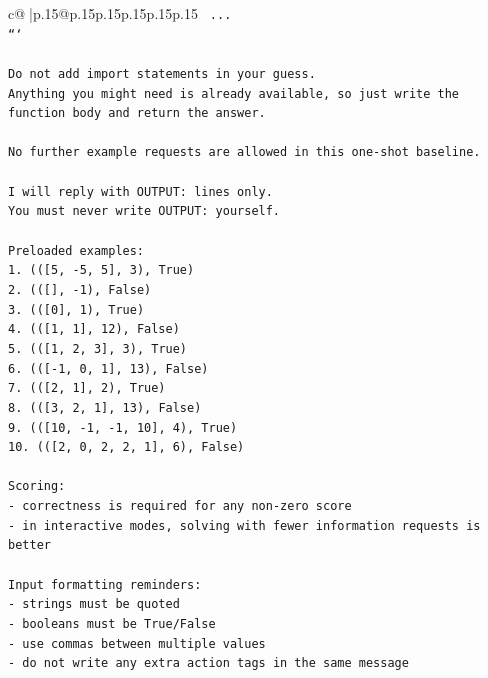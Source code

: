 \documentclass{article}
\begin{document}
{\begin{supertabular}{c@{$\;$}|p{.15\linewidth}@{}p{.15\linewidth}p{.15\linewidth}p{.15\linewidth}p{.15\linewidth}p{.15\linewidth}}
{{{\texttt{    ...} \\
\texttt{```} \\
\\ 
\texttt{Do not add import statements in your guess.} \\
\texttt{Anything you might need is already available, so just write the function body and return the answer.} \\
\\ 
\texttt{No further example requests are allowed in this one{-}shot baseline.} \\
\\ 
\texttt{I will reply with OUTPUT: lines only.} \\
\texttt{You must never write OUTPUT: yourself.} \\
\\ 
\texttt{Preloaded examples:} \\
\texttt{1. (({[}5, {-}5, 5{]}, 3), True)} \\
\texttt{2. (({[}{]}, {-}1), False)} \\
\texttt{3. (({[}0{]}, 1), True)} \\
\texttt{4. (({[}1, 1{]}, 12), False)} \\
\texttt{5. (({[}1, 2, 3{]}, 3), True)} \\
\texttt{6. (({[}{-}1, 0, 1{]}, 13), False)} \\
\texttt{7. (({[}2, 1{]}, 2), True)} \\
\texttt{8. (({[}3, 2, 1{]}, 13), False)} \\
\texttt{9. (({[}10, {-}1, {-}1, 10{]}, 4), True)} \\
\texttt{10. (({[}2, 0, 2, 2, 1{]}, 6), False)} \\
\\ 
\texttt{Scoring:} \\
\texttt{{-} correctness is required for any non{-}zero score} \\
\texttt{{-} in interactive modes, solving with fewer information requests is better} \\
\\ 
\texttt{Input formatting reminders:} \\
\texttt{{-} strings must be quoted} \\
\texttt{{-} booleans must be True/False} \\
\texttt{{-} use commas between multiple values} \\
\texttt{{-} do not write any extra action tags in the same message} \\
\\ 
}}}
\end{supertabular}}
\end{document}
